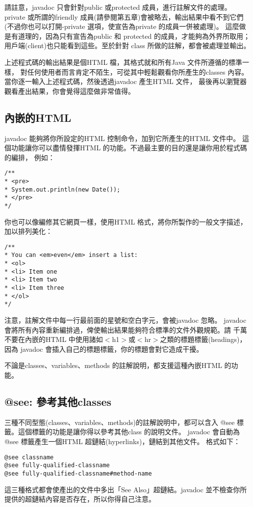 請註意，javadoc 只會針對public 或protected 成員，進行註解文件的處理。
private 或所謂的friendly 成員(請參閱第五章)會被略去，輸出結果中看不到它們
(不過你也可以打開-private 選項，使宣告為private 的成員一併被處理)。
這麼做是有道理的，因為只有宣告為public 和 protected 的成員，才能夠為外界所取用；
用戶端(client)也只能看到這些。至於針對 class 所做的註解，都會被處理並輸出。

上述程式碼的輸出結果是個HTML 檔，其格式就和所有Java 文件所遵循的標準一樣，
對任何使用者而言肯定不陌生，可從其中輕鬆觀看你所產生的classes 內容。
當你逐一輸入上述程式碼，然後透過javadoc 產生HTML 文件，
最後再以瀏覽器觀看產出結果，你會覺得這麼做非常值得。

\subsection{內嵌的HTML} 
javadoc 能夠將你所設定的HTML 控制命令，加到它所產生的HTML 文件中。
這個功能讓你可以盡情發揮HTML 的功能。不過最主要的目的還是讓你用於程式碼的編排，
例如：

\begin{Verbatim}[frame=single]
/**
* <pre>
* System.out.println(new Date());
* </pre>
*/
\end{Verbatim}

你也可以像編修其它網頁一樣，使用HTML 格式，將你所製作的一般文字描述，
加以排列美化：

\begin{Verbatim}[frame=single]
/**
* You can <em>even</em> insert a list:
* <ol>
* <li> Item one
* <li> Item two
* <li> Item three
* </ol>
*/
\end{Verbatim}

注意，註解文件中每一行最前面的星號和空白字元，會被javadoc 忽略。
javadoc 會將所有內容重新編排過，俾使輸出結果能夠符合標準的文件外觀規範。請
千萬不要在內嵌的HTML 中使用諸如$<$h1$>$或$<$hr$>$之類的標題標籤(headings)，因為
javadoc 會插入自己的標題標籤，你的標題會對它造成干擾。

不論是classes、variables、methods 的註解說明，都支援這種內嵌HTML
的功能。

\subsection{@see: 參考其他classes}
三種不同型態(classes、variables、methods)的註解說明中，都可以含入
@see 標籤。這個標籤的功能是讓你得以參考其他class 的說明文件。
javadoc 會自動為@see 標籤產生一個HTML 超鏈結(hyperlinks)，鏈結到其他文件。
格式如下：
\begin{Verbatim}[frame=single]
@see classname
@see fully-qualified-classname
@see fully-qualified-classname#method-name
\end{Verbatim}
這三種格式都會使產出的文件中多出「See Also」超鏈結。javadoc
並不檢查你所提供的超鏈結內容是否存在，所以你得自己注意。
